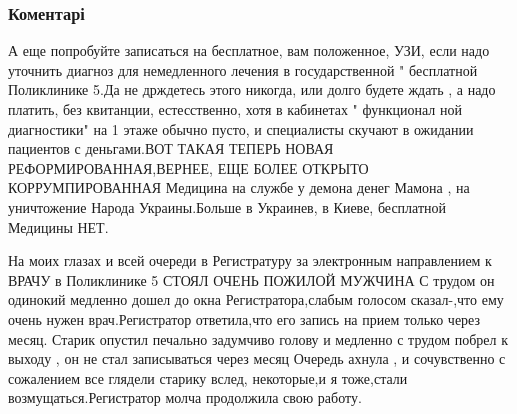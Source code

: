  
 
 
 
 
\subsubsection{Коментарі}
\label{sec:30_06_2021.fb.schur_valentina.1.poliklinika_verbickogo_darnickij_kiev.cmt}

\begin{itemize}

А еще попробуйте записаться на бесплатное, вам положенное, УЗИ, если надо
уточнить диагноз для немедленного лечения в государственной " бесплатной
Поликлинике 5.Да не држдетесь этого никогда, или долго будете ждать , а надо
платить, без квитанции, естесственно, хотя в кабинетах " функционал ной
диагностики" на 1 этаже обычно пусто, и специалисты скучают в ожидании
пациентов с деньгами.ВОТ ТАКАЯ ТЕПЕРЬ НОВАЯ РЕФОРМИРОВАННАЯ,ВЕРНЕЕ, ЕЩЕ БОЛЕЕ
ОТКРЫТО КОРРУМПИРОВАННАЯ Медицина на службе у демона денег Мамона , на
уничтожение Народа Украины.Больше в Украинев, в Киеве, бесплатной Медицины НЕТ.


На моих глазах и всей очереди в Регистратуру за электронным направлением к
ВРАЧУ в Поликлинике 5 СТОЯЛ ОЧЕНЬ ПОЖИЛОЙ МУЖЧИНА С трудом он одинокий медленно
дошел до окна Регистратора,слабым голосом сказал-,что ему очень нужен
врач.Регистратор ответила,что его запись на прием только через месяц. Старик
опустил печально задумчиво голову и медленно с трудом побрел к выходу , он не
стал записываться через месяц Очередь ахнула , и сочувственно с сожалением все
глядели старику вслед, некоторые,и я тоже,стали возмущаться.Регистратор молча
продолжила свою работу.

\end{itemize}

